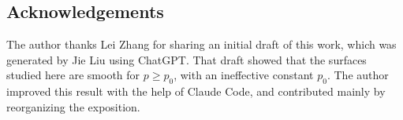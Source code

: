 \subsection*{Acknowledgements}
The author thanks Lei Zhang for sharing an initial draft of this work, which was generated by Jie Liu using ChatGPT.
That draft showed that the surfaces studied here are smooth for $p\geq p_0$, with an ineffective constant $p_0$.
The author improved this result with the help of Claude Code, and contributed mainly by reorganizing the exposition.
